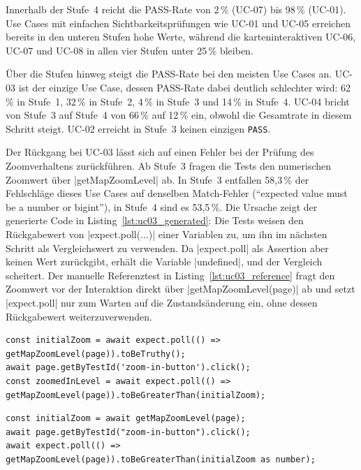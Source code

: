 Innerhalb der Stufe~4 reicht die PASS-Rate von 2\,\% (UC-07) bis 98\,\% (UC-01). Use Cases mit einfachen Sichtbarkeitsprüfungen wie UC-01 und UC-05 erreichen bereits in den unteren Stufen hohe Werte, während die karteninteraktiven UC-06, UC-07 und UC-08 in allen vier Stufen unter 25\,\% bleiben.

Über die Stufen hinweg steigt die PASS-Rate bei den meisten Use Cases an. UC-03 ist der einzige Use Case, dessen PASS-Rate dabei deutlich schlechter wird: 62\,\% in Stufe~1, 32\,\% in Stufe~2, 4\,\% in Stufe~3 und 14\,\% in Stufe~4. UC-04 bricht von Stufe~3 auf Stufe~4 von 66\,\% auf 12\,\% ein, obwohl die Gesamtrate in diesem Schritt steigt. UC-02 erreicht in Stufe~3 keinen einzigen \texttt{PASS}.

Der Rückgang bei UC-03 lässt sich auf einen Fehler bei der Prüfung des Zoomverhaltens zurückführen. Ab Stufe~3 fragen die Tests den numerischen Zoomwert über \code|getMapZoomLevel| ab. In Stufe~3 entfallen 58,3\,\% der Fehlschläge dieses Use Cases auf denselben Match-Fehler (\enquote{expected value must be a number or bigint}), in Stufe~4 sind es 53,5\,\%. Die Ursache zeigt der generierte Code in Listing~\ref{lst:uc03_generated}: Die Tests weisen den Rückgabewert von \code|expect.poll(...)| einer Variablen zu, um ihn im nächsten Schritt als Vergleichswert zu verwenden. Da \code|expect.poll| als Assertion aber keinen Wert zurückgibt, erhält die Variable \code|undefined|, und der Vergleich scheitert. Der manuelle Referenztest in Listing~\ref{lst:uc03_reference} fragt den Zoomwert vor der Interaktion direkt über \code|getMapZoomLevel(page)| ab und setzt \code|expect.poll| nur zum Warten auf die Zustandsänderung ein, ohne dessen Rückgabewert weiterzuverwenden.

\begin{listing}[H]
\caption{Fehlerhaftes Muster in den generierten Tests (gekürzt, Stufe 4, run\_01)}
\label{lst:uc03_generated}
\begin{verbatim}
const initialZoom = await expect.poll(() => getMapZoomLevel(page)).toBeTruthy();
await page.getByTestId('zoom-in-button').click();
const zoomedInLevel = await expect.poll(() => getMapZoomLevel(page)).toBeGreaterThan(initialZoom);
\end{verbatim}
\end{listing}

\begin{listing}[H]
\caption{Korrektes Muster im manuellen Referenztest (gekürzt)}
\label{lst:uc03_reference}
\begin{verbatim}
const initialZoom = await getMapZoomLevel(page);
await page.getByTestId("zoom-in-button").click();
await expect.poll(() => getMapZoomLevel(page)).toBeGreaterThan(initialZoom as number);
\end{verbatim}
\end{listing}

